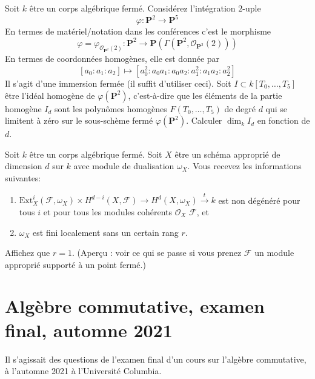 \begin{exercise}
\label{exercise-number-equations}
Soit $k$ être un corps algébrique fermé. Considérez l'intégration $2$-uple
$$
\varphi : \mathbf{P}^2 \longrightarrow \mathbf{P}^5
$$
En termes de matériel/notation dans les conférences c'est le morphisme
$$
\varphi = \varphi_{\mathcal{O}_{\mathbf{P}^2}(2)} :
\mathbf{P}^2
\longrightarrow
\mathbf{P}(\Gamma(\mathbf{P}^2, \mathcal{O}_{\mathbf{P}^2}(2)))
$$
En termes de coordonnées homogènes, elle est donnée par
$$
[a_0 : a_1 : a_2] \longmapsto
[a_0^2 : a_0a_1 : a_0a_2 : a_1^2 : a_1a_2 : a_2^2]
$$
Il s'agit d'une immersion fermée (il suffit
d'utiliser ceci). Soit $I \subset k[T_0, \ldots, T_5]$ être l'idéal
homogène de $\varphi(\mathbf{P}^2)$, c'est-à-dire que les éléments de
la partie homogène $I_d$
sont les polynômes homogènes $F(T_0, \ldots, T_5)$ de degré $d$
qui se limitent à zéro sur le sous-schème fermé $\varphi(\mathbf{P}^2)$. Calculer
$\dim_k I_d$ en fonction de $d$.
\end{exercise}

\begin{exercise}
\label{exercise-dualizing-sheaf-rank-1}
Soit $k$ être un corps algébrique fermé. Soit $X$ être un schéma
approprié de dimension $d$ sur $k$ avec module de
dualisation $\omega_X$. Vous recevez les informations suivantes:
\begin{enumerate}
\item $\text{Ext}^i_X(\mathcal{F}, \omega_X) \times H^{d - i}(X,
\mathcal{F}) \to H^d(X, \omega_X) \xrightarrow{t} k$ est non dégénéré
pour tous $i$ et pour tous les modules cohérents $\mathcal{O}_X$
$\mathcal{F}$, et
\item $\omega_X$ est fini localement sans un certain rang $r$.
\end{enumerate}
Affichez que $r = 1$. (Aperçu : voir ce qui se passe si vous
prenez $\mathcal{F}$ un module approprié supporté à un point fermé.)
\end{exercise}







\section{Algèbre commutative, examen final, automne 2021}
\label{section-final-exam-fall-2021}

\noindent
Il s'agissait des questions de l'examen final d'un cours sur l'algèbre commutative,
à l'automne 2021 à l'Université Columbia.

